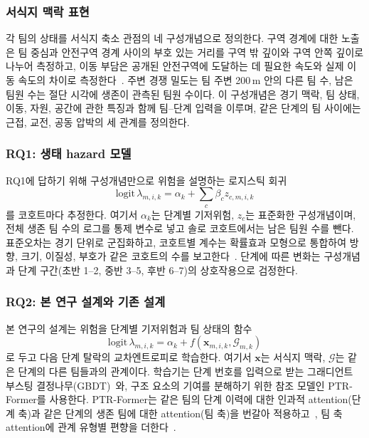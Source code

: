 \subsubsection{서식지 맥락 표현}
\label{sec:method:representation}
각 팀의 상태를 서식지 축소 관점의 네 구성개념으로 정의한다.
구역 경계에 대한 노출은 팀 중심과 안전구역 경계 사이의 부호 있는 거리를 구역 밖 깊이와 구역 안쪽 깊이로 나누어 측정하고, 이동 부담은 공개된 안전구역에 도달하는 데 필요한 속도와 실제 이동 속도의 차이로 측정한다~\cite{Nathan08}.
주변 경쟁 밀도는 팀 주변 200\,m 안의 다른 팀 수, 남은 팀원 수는 절단 시각에 생존이 관측된 팀원 수이다.
이 구성개념은 경기 맥락, 팀 상태, 이동, 자원, 공간에 관한 특징과 함께 팀--단계 입력을 이루며, 같은 단계의 팀 사이에는 근접, 교전, 공동 압박의 세 관계를 정의한다.

\subsubsection{RQ1: 생태 hazard 모델}
\label{sec:method:rq1}
RQ1에 답하기 위해 구성개념만으로 위험을 설명하는 로지스틱 회귀
\begin{equation}
\mathrm{logit}\,\lambda_{m,i,k}=\alpha_k+\textstyle\sum_{c}\beta_c z_{c,m,i,k}
\label{eq:ehm}
\end{equation}
를 코호트마다 추정한다. 여기서 $\alpha_k$는 단계별 기저위험, $z_c$는 표준화한 구성개념이며, 전체 생존 팀 수의 로그를 통제 변수로 넣고 솔로 코호트에서는 남은 팀원 수를 뺀다.
표준오차는 경기 단위로 군집화하고, 코호트별 계수는 확률효과 모형으로 통합하여 방향, 크기, 이질성, 부호가 같은 코호트의 수를 보고한다~\cite{DerSimonian86}.
단계에 따른 변화는 구성개념과 단계 구간(초반 1--2, 중반 3--5, 후반 6--7)의 상호작용으로 검정한다.

\subsubsection{RQ2: 본 연구 설계와 기존 설계}
\label{sec:method:rq2}
본 연구의 설계는 위험을 단계별 기저위험과 팀 상태의 함수
\begin{equation}
\mathrm{logit}\,\lambda_{m,i,k}=\alpha_k+f(\mathbf{x}_{m,i,k},\mathcal{G}_{m,k})
\label{eq:logit}
\end{equation}
로 두고 다음 단계 탈락의 교차엔트로피로 학습한다. 여기서 $\mathbf{x}$는 서식지 맥락, $\mathcal{G}$는 같은 단계의 다른 팀들과의 관계이다.
학습기는 단계 번호를 입력으로 받는 그래디언트 부스팅 결정나무(GBDT)~\cite{Friedman01,Ke17}와, 구조 요소의 기여를 분해하기 위한 참조 모델인 PTR-Former를 사용한다.
PTR-Former는 같은 팀의 단계 이력에 대한 인과적 attention(단계 축)과 같은 단계의 생존 팀에 대한 attention(팀 축)을 번갈아 적용하고~\cite{Vaswani17}, 팀 축 attention에 관계 유형별 편향을 더한다~\cite{Ying21}.

